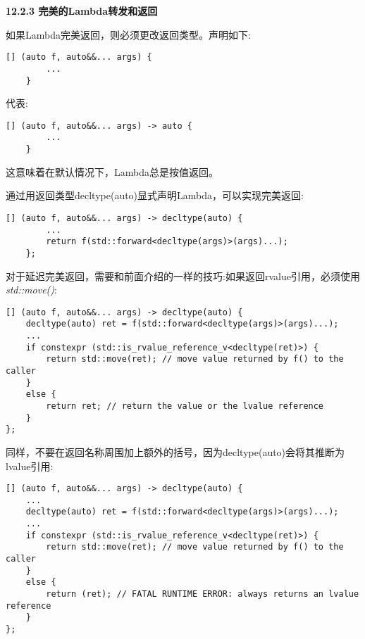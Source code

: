 \hspace*{\fill} \par %
\textbf{12.2.3 完美的Lambda转发和返回}

如果Lambda完美返回，则必须更改返回类型。声明如下:\par

\begin{lstlisting}[caption={}]
	[] (auto f, auto&&... args) {
		...
	}
\end{lstlisting}

代表:\par

\begin{lstlisting}[caption={}]
	[] (auto f, auto&&... args) -> auto {
		...
	}
\end{lstlisting}

这意味着在默认情况下，Lambda总是按值返回。\par

通过用返回类型decltype(auto)显式声明Lambda，可以实现完美返回:\par

\begin{lstlisting}[caption={}]
	[] (auto f, auto&&... args) -> decltype(auto) {
		...
		return f(std::forward<decltype(args)>(args)...);
	};
\end{lstlisting}

对于延迟完美返回，需要和前面介绍的一样的技巧:如果返回rvalue引用，必须使用\textit{std::move()}:\par

\begin{lstlisting}[caption={}]
[] (auto f, auto&&... args) -> decltype(auto) {
	decltype(auto) ret = f(std::forward<decltype(args)>(args)...);
	...
	if constexpr (std::is_rvalue_reference_v<decltype(ret)>) {
		return std::move(ret); // move value returned by f() to the caller
	}
	else {
		return ret; // return the value or the lvalue reference
	}
};
\end{lstlisting}

同样，不要在返回名称周围加上额外的括号，因为decltype(auto)会将其推断为lvalue引用:\par

\begin{lstlisting}[caption={}]
[] (auto f, auto&&... args) -> decltype(auto) {
	...
	decltype(auto) ret = f(std::forward<decltype(args)>(args)...);
	...
	if constexpr (std::is_rvalue_reference_v<decltype(ret)>) {
		return std::move(ret); // move value returned by f() to the caller
	}
	else {
		return (ret); // FATAL RUNTIME ERROR: always returns an lvalue reference
	}
};
\end{lstlisting}










